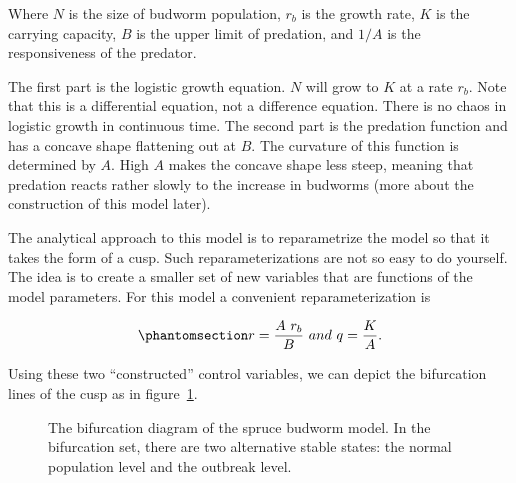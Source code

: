 \documentclass[
  a4paper,
  DIV=11,
  numbers=noendperiod,
  oneside]{scrreprt}
\begin{document}
Where \(N\) is the size of budworm population, \(r_{b}\) is the growth
rate, \(K\) is the carrying capacity, \(B\) is the upper limit of
predation, and \(1/A\) is the responsiveness of the predator.

The first part is the logistic growth equation. \(N\) will grow to \(K\)
at a rate \(r_{b}\). Note that this is a differential equation, not a
difference equation. There is no chaos in logistic growth in continuous
time. The second part is the predation function and has a concave shape
flattening out at \(B\). The curvature of this function is determined by
\(A\). High \(A\) makes the concave shape less steep, meaning that
predation reacts rather slowly to the increase in budworms (more about
the construction of this model later).

The analytical approach to this model is to reparametrize the model so
that it takes the form of a cusp. Such reparameterizations are not so
easy to do yourself. The idea is to create a smaller set of new
variables that are functions of the model parameters. For this model a
convenient reparameterization is

\begin{equation}\phantomsection\label{eq-ch3-8-old-12}{
r = \frac{A\ r_{b}}{B}\ and\ q = \frac{K}{A}.
}\end{equation}

Using these two ``constructed'' control variables, we can depict the
bifurcation lines of the cusp as in figure~\ref{fig-ch3-img16-old-28}.

\begin{figure}


\caption{\label{fig-ch3-img16-old-28}The bifurcation diagram of the
spruce budworm model. In the bifurcation set, there are two alternative
stable states: the normal population level and the outbreak level.}

\end{figure}%
\end{document}
